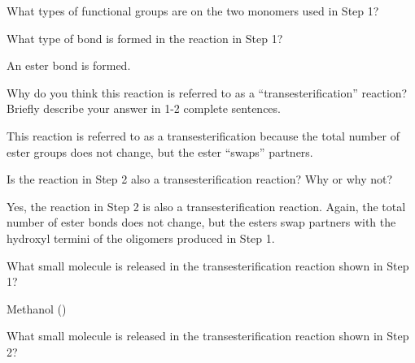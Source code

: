 \begin{activity}
\begin{ctqs}
		\question What types of functional groups are on the two monomers used in Step 1?
		
			\begin{solution}[1.5in]
			\end{solution}
		
		\question What type of bond is formed in the reaction in Step 1?
		
			\begin{solution}[1.5in]
				An ester bond is formed.
			\end{solution}
		
		\question Why do you think this reaction is referred to as a ``transesterification'' reaction?  Briefly describe your answer in 1-2 complete sentences.
		
			\begin{solution}[1.75in]
				This reaction is referred to as a transesterification because the total number of ester groups does not change, but the ester ``swaps'' partners.
			\end{solution}
		
		\question Is the reaction in Step 2 also a transesterification reaction?  Why or why not?
		
			\begin{solution}[1.5in]
				Yes, the reaction in Step 2 is also a transesterification reaction.  Again, the total number of ester bonds does not change, but the esters swap partners with the hydroxyl termini of the oligomers produced in Step 1.
			\end{solution}
			
		\question What small molecule is released in the transesterification reaction shown in Step 1?
		
			\begin{solution}[1in]
				Methanol ()
			\end{solution}
		
		\question What small molecule is released in the transesterification reaction shown in Step 2?
		
			\begin{solution}[1in]
			\end{solution}
			

\end{ctqs}
\end{activity}
